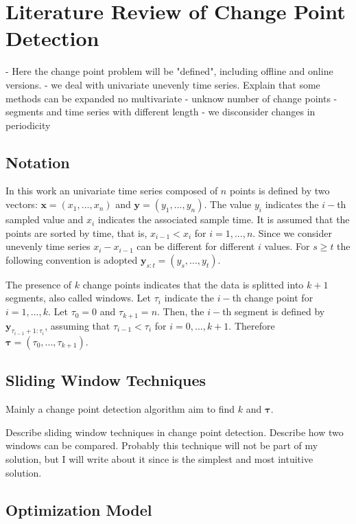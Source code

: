 \chapter{Literature Review of Change Point Detection} 

- Here the change point problem will be "defined", including offline and online versions.
- we deal with univariate unevenly time series. Explain that some methods can be expanded no multivariate
- unknow number of change points
- segments and time series with different length
- we disconsider changes in periodicity

\section{Notation}

In this work an univariate time series composed of $n$ points is defined by two vectors: $\mathbf{x} = (x_{1}, ..., x_{n})$ and $\mathbf{y} = (y_{1}, ..., y_{n})$. The value $y_{i}$ indicates the $i-$th sampled value and $x_{i}$ indicates the associated sample time. It is assumed that the points are sorted by time, that is, $x_{i - 1} < x_{i}$ for $i = 1, ..., n$. Since we consider unevenly time series $x_{i} - x_{i - 1}$ can be different for different $i$ values. For $s \ge t$ the following convention is adopted $\mathbf{y}_{s:t} = (y_{s}, ..., y_{t})$.

The presence of $k$ change points indicates that the data is splitted into $k+1$ segments, also called windows. Let $\tau_{i}$ indicate the $i-$th change point for $i=1,...,k$. Let $\tau_{0} = 0$ and $\tau_{k + 1} = n$. Then, the $i-$th segment is defined by $\mathbf{y}_{\tau_{i - 1} + 1 : \tau_{i}}$, assuming that $\tau_{i - 1} < \tau_{i}$ for $i = 0, ..., k + 1$. Therefore $\boldsymbol \tau = (\tau_{0}, ..., \tau_{k + 1})$.

\section{Sliding Window Techniques}

Mainly a change point detection algorithm aim to find $k$ and $\boldsymbol \tau$.

Describe sliding window techniques in change point detection. Describe how two windows can be compared. Probably this technique will not be part of my solution, but I will write about it since is the simplest and most intuitive solution.

\section{Optimization Model}  

